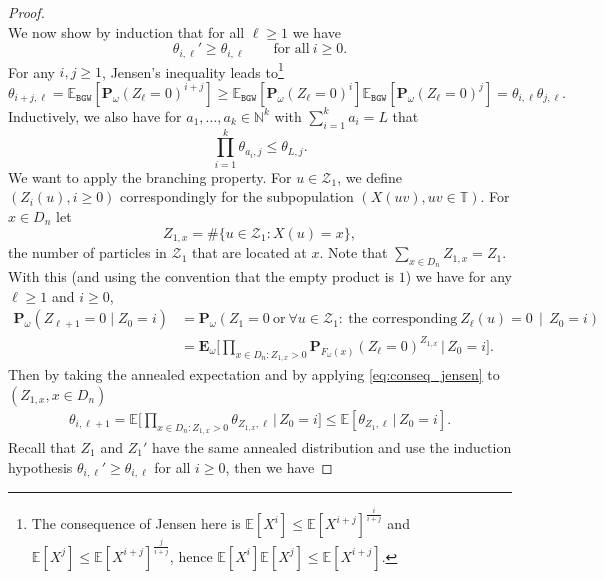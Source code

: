 \documentclass[11 pt]{article}
\theoremstyle{definition}
\numberwithin{equation}{section}
\newcommand{\NN}{\mathbb{N}}
\newcommand{\EE}{\mathbb{E}} %
\newcommand{\Pw}{\mathbf{P}_{\omega}} %
\begin{document}
\begin{proof}
\begin{equation*}
	\end{equation*}
	We now show by induction that for all $\ell\geq 1$ we have
	\begin{equation*}
		\theta_{i,\ell}' \geq \theta_{i,\ell} \qquad \text{for all} ~ i\geq0.
	\end{equation*}
	For any $i,j\ge 1$, Jensen's inequality leads to\footnote{The consequence of Jensen here is $\EE[X^i]\leq \EE[X^{i+j}]^{\frac{i}{i+j}}$ and $\EE[X^j]\leq \EE[X^{i+j}]^{\frac{j}{i+j}}$, hence $\EE[X^i]\EE[X^j]\leq \EE[X^{i+j}]$.}
	\begin{equation*}
		\theta_{i+j,\ell} =\EE_{\mathtt{BGW}}  \left[ \Pw(Z_\ell= 0)^{i+j} \right] \ge 
		\EE_{\mathtt{BGW}} \left[  \Pw(Z_\ell= 0)^{i} \right]
		\EE_{\mathtt{BGW}} \left[ \Pw(Z_\ell= 0)^{j} \right]
		=\theta_{i,\ell} \theta_{j,\ell}.
	\end{equation*}
	Inductively, we also have for $a_1,\ldots,a_k \in \NN^k$ with $\sum_{i=1}^k a_i = L$ that
	\begin{equation}\label{eq:conseq_jensen}
		\prod_{i=1}^k \theta_{a_i,j} \leq \theta_{L,j}.
	\end{equation}
	We want to apply the branching property. For $u\in \mathcal Z_1$, we define $(Z_i(u), i \ge 0)$ correspondingly for the subpopulation $(X(uv), uv\in \mathbb{T})$. For $x\in D_n$ let 
	$$Z_{1,x} =\#\{u \in \mathcal Z_1: X(u)=x\},$$ 
	the number of particles in $\mathcal Z_1$ that are located at $x$. 
	Note that $\sum_{x\in D_n}Z_{1,x} = Z_1$. With this (and using the convention that the empty product is $1$) we have for any $\ell\geq 1$ and $i\ge 0$,
	\begin{align*}
		\Pw \left( Z_{\ell+1} = 0\mid Z_0 = i\right) 
		& = \Pw \left( Z_{1} = 0~\text{or}	
		~\forall u\in \mathcal{Z}_1:~\text{the corresponding}~Z_\ell(u) = 0 \,\middle|\, Z_0 =i \right) \\
		&=\mathbf{E}_{\omega} \bigg[  \prod_{x\in D_n : Z_{1,x}>0} \mathbf{P}_{F_\omega(x)} \left( Z_{\ell} = 0\right)^{Z_{1,x}} \,\bigg|\,  Z_0 = i \bigg].
	\end{align*}
	Then by taking the annealed expectation and by applying  \eqref{eq:conseq_jensen} to $(Z_{1,x},x\in D_n)$
	\begin{align*}
		\theta_{i,\ell+1} = \EE \bigg[ \prod_{x\in D_n : Z_{1,x}>0 } \theta_{Z_{1,x}, \ell}  \,\bigg|\,  Z_0 = i  \bigg] 
		\le\EE\left[  \theta_{Z_1, \ell}\,\bigg|\,  Z_0 = i   \right].
	\end{align*}
Recall that $Z_1$ and $Z_1'$ have the same annealed distribution and use the induction hypothesis $\theta_{i,\ell}' \geq \theta_{i,\ell}$ for all $i\geq0$, then we have 

\end{proof}
\end{document}
